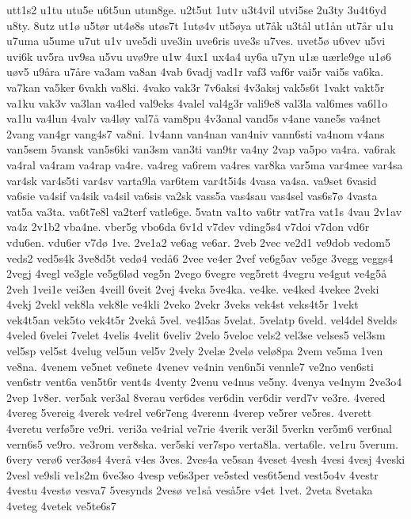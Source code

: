 utt1s2
u1tu
utu5e
u6t5un
utun8ge.
u2t5ut
1utv
u3t4vil
utvi5se
2u3ty
3u4t6yd
u8ty.
8utz
ut1^^f8
u5t^^f8r
ut4^^f88s
ut^^f8s7t
1ut^^f84v
ut5^^f8ya
ut7^^e5k
u3t^^e5l
ut1^^e5n
ut7^^e5r
u1u
u7uma
u5ume
u7ut
u1v
uve5di
uve3in
uve6ris
uve3s
u7ves.
uvet5^^f8
u6vev
u5vi
uvi6k
uv5ra
uv9sa
u5vu
uv^^f89re
u1w
4ux1
ux4a4
uy6a
u7yn
u1^^e6
u^^e6rle9ge
u1^^f86
u^^f8v5
u9^^e5ra
u7^^e5re
va3am
va8an
4vab
6vadj
vad1r
vaf3
vaf6r
vai5r
vai5s
va6ka.
va7kan
va5ker
6vakh
va8ki.
4vako
vak3r
7v6aksi
4v3aksj
vak5s6t
1vakt
vakt5r
va1ku
vak3v
va3lan
va4led
val9eks
4valel
val4g3r
vali9e8
val3la
val6mes
va6l1o
va1lu
va4lun
4valv
va4l^^f8y
val7^^e5
vam8pu
4v3anal
vand5s
v4ane
vane5s
va4net
2vang
van4gr
vang4s7
va8ni.
1v4ann
van4nan
van4niv
vann6sti
va4nom
v4ans
van5sem
5vansk
van5s6ki
van3sm
van3ti
van9tr
va4ny
2vap
va5po
va4ra.
va6rak
va4ral
va4ram
va4rap
va4re.
va4reg
va6rem
va4res
var8ka
var5ma
var4mee
var4sa
var4sk
var4s5ti
var4sv
varta9la
var6tem
var4t5i4s
4vasa
va4sa.
va9set
6vasid
va6sie
va4sif
va4sik
va4sil
va6sis
va2sk
vass5a
vas4sau
vas4sel
vas6s7^^f8
4vasta
vat5a
va3ta.
va6t7e8l
va2terf
vatle6ge.
5vatn
va1to
va6tr
vat7ra
vat1s
4vau
2v1av
va4z
2v1b2
vba4ne.
vber5g
vbo6da
6v1d
v7dev
vding5s4
v7doi
v7don
vd6r
vdu6en.
vdu6er
v7d^^f8
1ve.
2ve1a2
ve6ag
ve6ar.
2veb
2vec
ve2d1
ve9dob
vedom5
veds2
ved5s4k
3ve8d5t
ved^^f84
ved^^e56
2vee
ve4er
2vef
ve6g5av
ve5ge
3vegg
veggs4
2vegj
4vegl
ve3gle
ve5g6l^^f8d
veg5n
2vego
6vegre
veg5rett
4vegru
ve4gut
ve4g5^^e5
2veh
1vei1e
vei3en
4veill
6veit
2vej
4veka
5ve4ka.
ve4ke.
ve4ked
4vekee
2veki
4vekj
2vekl
vek8la
vek8le
ve4kli
2veko
2vekr
3veks
vek4st
veks4t5r
1vekt
vek4t5an
vek5to
vek4t5r
2vek^^e5
5vel.
ve4l5as
5velat.
5velatp
6veld.
vel4del
8velds
4veled
6velei
7velet
4velis
4velit
6veliv
2velo
5veloc
vels2
vel3se
velses5
vel3sm
vel5sp
vel5st
4velug
vel5un
vel5v
2vely
2vel^^e6
2vel^^f8
vel^^f88pa
2vem
ve5ma
1ven
ve8na.
4venem
ve5net
ve6nete
4venev
ve4nin
ven6n5i
vennle7
ve2no
ven6sti
ven6str
vent6a
ven5t6r
vent4s
4venty
2venu
ve4nus
ve5ny.
4venya
ve4nym
2ve3o4
2vep
1v8er.
ver5ak
ver3al
8verau
ver6des
ver6din
ver6dir
verd7v
ve3re.
4vered
4vereg
5vereig
4verek
ve4rel
ve6r7eng
4verenn
4verep
ve5rer
ve5res.
4verett
4veretu
verf^^f85re
ve9ri.
veri3a
ve4rial
ve7rie
4verik
ver3il
5verkn
ver5m6
ver6nal
vern6s5
ve9ro.
ve3rom
ver8ska.
ver5ski
ver7spo
verta8la.
verta6le.
ve1ru
5verum.
6very
ver^^f86
ver3^^f8s4
4ver^^e5
v4es
3ves.
2ves4a
ve5san
4veset
4vesh
4vesi
4vesj
4veski
2vesl
ve9sli
ve1s2m
6ve3so
4vesp
ve6s3per
ve5sted
ves6t5end
vest5o4v
4vestr
4vestu
4vest^^f8
vesva7
5vesynds
2ves^^f8
ve1s^^e5
ves^^e55re
v4et
1vet.
2veta
8vetaka
4veteg
4vetek
ve5te6s7
